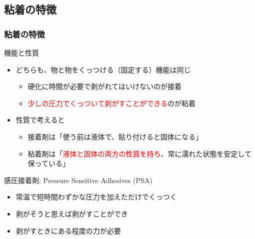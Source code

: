 \documentclass[unicode,12pt]{beamer}%
\begin{document}
\subsection{粘着の特徴}
\begin{frame}
	\frametitle{粘着の特徴}
	\vspace{-2mm}
	\begin{block}{機能と性質}
		\begin{itemize}
			\item どちらも、物と物をくっつける（固定する）機能は同じ
			\begin{itemize}
				\item 硬化に時間が必要で剥がれてはいけないのが接着
				\item \textcolor{red}{少しの圧力でくっついて剥がすことができる}のが粘着
			\end{itemize}
			\item 性質で考えると
			\begin{itemize}
				\item 接着剤は「使う前は液体で、貼り付けると固体になる」
				\item 粘着剤は「\textcolor{red}{液体と固体の両方の性質を持ち}、常に濡れた状態を安定して保っている」
			\end{itemize}
		\end{itemize}
	\end{block}
	\vspace{-2mm}
	\begin{alertblock}{感圧接着剤: Pressure Sensitive Adhesives (PSA)}
		\begin{itemize}
			\item 常温で短時間わずかな圧力を加えただけでくっつく
			\item 剥がそうと思えば剥がすことができ
			\item 剥がすときにある程度の力が必要
		\end{itemize}
	\end{alertblock}
\end{frame}
\end{document}
